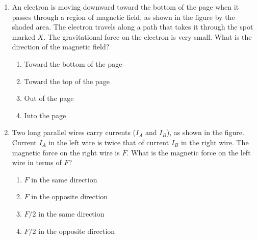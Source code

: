\documentclass{../../../oss-classkick}
\begin{document}
\genheader


\genmultidirections

\raggedcolumns
\begin{multicols}{2}

 \begin{enumerate}[leftmargin=18pt]
  \item  An electron is moving downward toward the bottom of the page when
    it passes through a region of magnetic field, as shown in the figure by
    the shaded area. The electron travels along a path that takes it through
    the spot marked $X$. The gravitational force on the electron is very
    small. What is the direction of the magnetic field?
    \begin{center}
    \end{center}
    \begin{enumerate}[nosep,leftmargin=18pt,label=(\Alph*)]
    \item Toward the bottom of the page
    \item Toward the top of the page
    \item Out of the page
    \item Into the page
    \end{enumerate}
    \vspace{.7in}
    
  \item Two long parallel wires carry currents ($I_A$ and $I_B$), as shown in
    the figure. Current $I_A$ in the left wire is twice that of current $I_B$ in
    the right wire. The magnetic force on the right wire is $F$. What is the
    magnetic force on the left wire in terms of $F$?
    \begin{center}
    \end{center}
    \begin{enumerate}[nosep,leftmargin=18pt,label=(\Alph*)]
    \item $F$ in the same direction
    \item $F$ in the opposite direction
    \item $F/2$ in the same direction
    \item $F/2$ in the opposite direction
    \end{enumerate}
    \vspace{.7in}
    

\end{enumerate}
\end{multicols}
\end{document}

